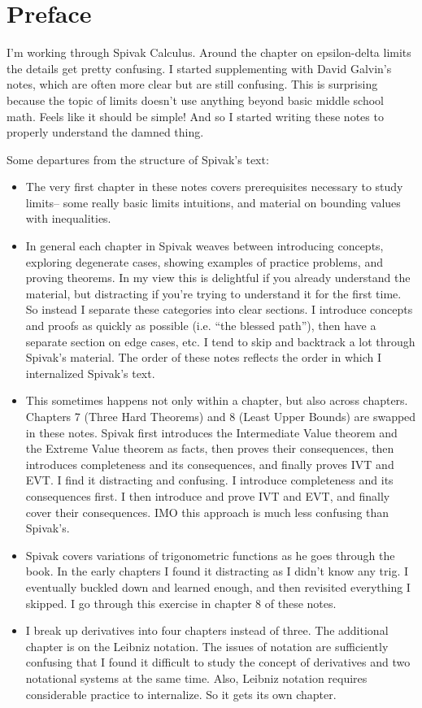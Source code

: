 
\section{Preface}

I'm working through Spivak Calculus. Around the chapter on
epsilon-delta limits the details get pretty confusing. I started
supplementing with David Galvin's notes, which are often more clear
but are still confusing. This is surprising because the topic of
limits doesn't use anything beyond basic middle school math. Feels
like it should be simple! And so I started writing these notes to
properly understand the damned thing.

\vs

Some departures from the structure of Spivak's text:
\begin{itemize}
\item The very first chapter in these notes covers prerequisites
  necessary to study limits-- some really basic limits intuitions, and
  material on bounding values with inequalities.
\item In general each chapter in Spivak weaves between introducing
  concepts, exploring degenerate cases, showing examples of practice
  problems, and proving theorems. In my view this is delightful if you
  already understand the material, but distracting if you're trying to
  understand it for the first time. So instead I separate these
  categories into clear sections. I introduce concepts and proofs as
  quickly as possible (i.e. ``the blessed path''), then have a
  separate section on edge cases, etc. I tend to skip and backtrack a
  lot through Spivak's material. The order of these notes reflects the
  order in which I internalized Spivak's text.
\item This sometimes happens not only within a chapter, but also
  across chapters. Chapters 7 (Three Hard Theorems) and 8 (Least Upper
  Bounds) are swapped in these notes. Spivak first introduces the
  Intermediate Value theorem and the Extreme Value theorem as facts,
  then proves their consequences, then introduces completeness and its
  consequences, and finally proves IVT and EVT. I find it distracting
  and confusing. I introduce completeness and its consequences first.
  I then introduce and prove IVT and EVT, and finally cover their
  consequences. IMO this approach is much less confusing than
  Spivak's.
\item Spivak covers variations of trigonometric functions as he goes
  through the book. In the early chapters I found it distracting as I
  didn't know any trig. I eventually buckled down and learned enough,
  and then revisited everything I skipped. I go through this exercise
  in chapter 8 of these notes.
\item I break up derivatives into four chapters instead of three. The
  additional chapter is on the Leibniz notation. The issues of
  notation are sufficiently confusing that I found it difficult to
  study the concept of derivatives and two notational systems at the
  same time. Also, Leibniz notation requires considerable practice to
  internalize. So it gets its own chapter.
\end{itemize}


